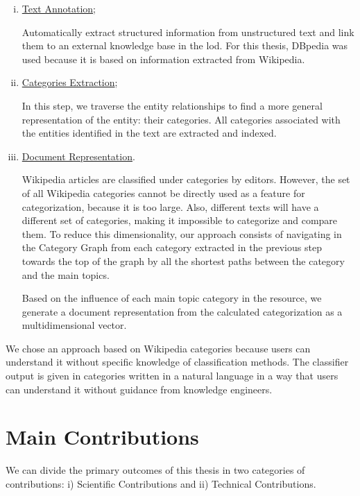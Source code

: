 \begin{enumerate}[(i)]
\item \hyperref[sec:text-annotation]{Text Annotation};

Automatically extract structured information from unstructured text and link them to an external knowledge base in the \gls{lod}. For this thesis, DBpedia was used because it is based on information extracted from Wikipedia.

\item \hyperref[sec:categories-extraction]{Categories Extraction};

In this step, we traverse the entity relationships to find a more general representation of the entity: their categories. All categories associated with the entities identified in the text are extracted and indexed.

\item \hyperref[sec:doc-representation]{Document Representation}.

Wikipedia articles are classified under categories by editors. However, the set of all Wikipedia categories cannot be directly used as a feature for categorization, because it is too large. Also,  different texts will have a different set of categories, making it impossible to categorize and compare them. To reduce this dimensionality, our approach consists of navigating in the Category Graph from each category extracted in the previous step towards the top of the graph by all the shortest paths between the category and the main topics. 

Based on the influence of each main topic category in the resource, we generate a document representation from the calculated categorization as a multidimensional vector.

\end{enumerate}
We chose an approach based on Wikipedia categories because users can understand it without specific knowledge of classification methods. The classifier output is given in categories written in a natural language in a way that users can understand it without guidance from knowledge engineers. 



\section{\hspace*{3pt}Main Contributions}

We can divide the primary outcomes of this thesis in two categories of contributions: i) Scientific Contributions and ii) Technical Contributions.

